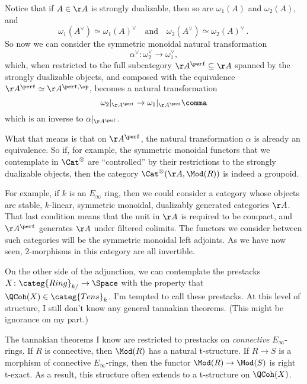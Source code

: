 \documentclass[leqno]{article}
\begin{document}
Notice that if \(A \in \AA\) is strongly dualizable,
then so are \(\omega_{1}(A)\) and \(\omega_{2}(A)\), and
\begin{equation*}
    \omega_{1}(A^{\vee}) \simeq \omega_{1}(A)^{\vee}
    \quad \text{and} \quad
    \omega_{2}(A^{\vee}) \simeq \omega_{2}(A)^{\vee} \period
\end{equation*}
So now we can consider the symmetric monoidal
natural transformation
\begin{equation*}
    \alpha^{\vee} \colon \omega_{2}^{\vee} \to \omega_{1}^{\vee}
    \comma
\end{equation*}
which, when restricted to the full subcategory
\(\AA^{\perf} \subseteq \AA\)
spanned by the strongly dualizable objects,
and composed with the equivalence
\(\AA^{\perf} \simeq \AA^{\perf,\op}\),
becomes a natural transformation
\begin{equation*}
    \omega_{2}|_{\AA^{\perf}}
    \to
    \omega_{1}|_{\AA^{\perf}} \comma
\end{equation*}
which is an inverse to \(\alpha|_{\AA^{\perf}}\).

What that means is that on \(\AA^{\perf}\),
the natural transformation \(\alpha\) is already an equivalence.
So if, for example, the symmetric monoidal functors
that we contemplate in \(\Cat^{\otimes}\) are
\enquote{controlled} by their restrictions
to the strongly dualizable objects, then the category
\(\Cat^{\otimes}(\AA,\Mod(R))\) is indeed a groupoid.

For example, if \(k\) is an \(E_{\infty}\) ring,
then we could consider a category whose objects are
stable, \(k\)-linear, symmetric monoidal,
dualizably generated categories \(\AA\).
That last condition means that
the unit in \(\AA\) is required to be compact, and
\(\AA^{\perf}\) generates \(\AA\) under filtered colimits.
The functors we consider between such categories will be
the symmetric monoidal left adjoints.
As we have now seen,
\(2\)-morphisms in this category are all invertible.

On the other side of the adjunction,
we can contemplate the prestacks
\(X \colon \categ{Ring}_{k/} \to \Space\)
with the property that \(\QCoh(X) \in \categ{Tens}_k\).
I'm tempted to call these  prestacks.
At this level of structure,
I still don't know any general tannakian theorems.
(This might be ignorance on my part.)

The tannakian theorems I know are restricted
to prestacks on \emph{connective} \(E_{\infty}\)-rings.
If \(R\) is connective, then \(\Mod(R)\) has a natural t-structure.
If \(R \to S\) is a morphism of connective \(E_{\infty}\)-rings,
then the functor \(\Mod(R) \to \Mod(S)\) is right t-exact.
As a result, this structure often extends
to a t-structure on \(\QCoh(X)\).
\end{document}
